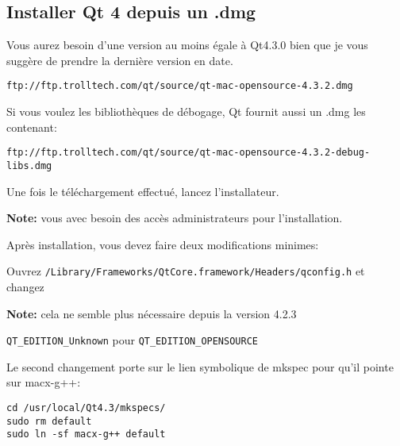 \subsection{Installer Qt 4 depuis un .dmg}
Vous aurez besoin d'une version au moins \'egale \`a Qt4.3.0 bien que je vous sugg\`ere de prendre la derni\`ere version en date.

\begin{verbatim}
ftp://ftp.trolltech.com/qt/source/qt-mac-opensource-4.3.2.dmg
\end{verbatim}

Si vous voulez les biblioth\`eques de d\'ebogage, Qt fournit aussi un .dmg les contenant:

\begin{verbatim}
ftp://ftp.trolltech.com/qt/source/qt-mac-opensource-4.3.2-debug-libs.dmg
\end{verbatim}

Une fois le t\'el\'echargement effectu\'e, lancez l'installateur.

% 
% 
% 
% 
% 
% 

\textbf{Note:} vous avec besoin des acc\`es administrateurs pour l'installation.

Apr\`es installation, vous devez faire deux modifications minimes:

Ouvrez \texttt{/Library/Frameworks/QtCore.framework/Headers/qconfig.h} et changez

\textbf{Note:} cela ne semble plus n\'ecessaire depuis la version 4.2.3

\texttt{QT\_EDITION\_Unknown} pour \texttt{QT\_EDITION\_OPENSOURCE}

Le second changement porte sur le lien symbolique de mkspec pour qu'il pointe sur macx-g++:

\begin{verbatim}
cd /usr/local/Qt4.3/mkspecs/ 
sudo rm default 
sudo ln -sf macx-g++ default
\end{verbatim}

